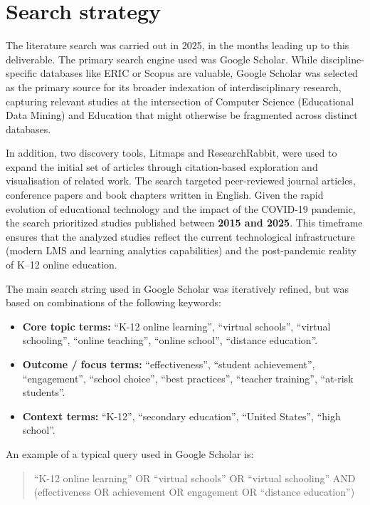\section{Search strategy}
\label{sec:search-strategy}
The literature search was carried out in 2025, in the months leading up to this deliverable.
The primary search engine used was Google Scholar. While discipline-specific databases like ERIC or Scopus are valuable, Google Scholar was selected as the primary source for its broader indexation of interdisciplinary research, capturing relevant studies at the intersection of Computer Science (Educational Data Mining) and Education that might otherwise be fragmented across distinct databases.

In addition, two discovery tools, Litmaps and ResearchRabbit, were used to expand the initial set of articles through citation-based exploration and visualisation of related work.
The search targeted peer-reviewed journal articles, conference papers and book chapters written in English.
Given the rapid evolution of educational technology and the impact of the COVID-19 pandemic, the search prioritized studies published between \textbf{2015 and 2025}.
This timeframe ensures that the analyzed studies reflect the current technological infrastructure (modern LMS and learning analytics capabilities) and the post-pandemic reality of K--12 online education.

The main search string used in Google Scholar was iteratively refined, but was based on combinations of the following keywords:
\begin{itemize}
    \item \textbf{Core topic terms:} ``K-12 online learning'', ``virtual schools'', ``virtual schooling'', ``online teaching'', ``online school'', ``distance education''.
    \item \textbf{Outcome / focus terms:} ``effectiveness'', ``student achievement'', ``engagement'', ``school choice'', ``best practices'', ``teacher training'', ``at-risk students''.
    \item \textbf{Context terms:} ``K-12'', ``secondary education'', ``United States'', ``high school''.
\end{itemize}

An example of a typical query used in Google Scholar is:
\begin{quote}
``K-12 online learning'' OR ``virtual schools'' OR ``virtual schooling'' AND (effectiveness OR achievement OR engagement OR ``distance education'')
\end{quote}

